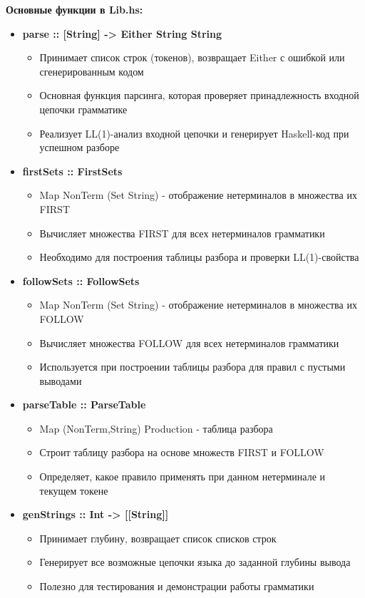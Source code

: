 \documentclass[areasetadvanced]{scrartcl}
\begin{document}
\textbf{Основные функции в Lib.hs:}
\begin{itemize}
  \item \textbf{parse :: [String] -> Either String String}
  \begin{itemize}
    \item Принимает список строк (токенов), возвращает Either с ошибкой или сгенерированным кодом
    \item Основная функция парсинга, которая проверяет принадлежность входной цепочки грамматике
    \item Реализует LL(1)-анализ входной цепочки и генерирует Haskell-код при успешном разборе
  \end{itemize}

  \item \textbf{firstSets :: FirstSets}
  \begin{itemize}
    \item Map NonTerm (Set String) - отображение нетерминалов в множества их FIRST
    \item Вычисляет множества FIRST для всех нетерминалов грамматики
    \item Необходимо для построения таблицы разбора и проверки LL(1)-свойства
  \end{itemize}

  \item \textbf{followSets :: FollowSets}
  \begin{itemize}
    \item Map NonTerm (Set String) - отображение нетерминалов в множества их FOLLOW
    \item Вычисляет множества FOLLOW для всех нетерминалов грамматики
    \item Используется при построении таблицы разбора для правил с пустыми выводами
  \end{itemize}

  \item \textbf{parseTable :: ParseTable}
  \begin{itemize}
    \item Map (NonTerm,String) Production - таблица разбора
    \item Строит таблицу разбора на основе множеств FIRST и FOLLOW
    \item Определяет, какое правило применять при данном нетерминале и текущем токене
  \end{itemize}

  \item \textbf{genStrings :: Int -> [[String]]}
  \begin{itemize}
    \item Принимает глубину, возвращает список списков строк
    \item Генерирует все возможные цепочки языка до заданной глубины вывода
    \item Полезно для тестирования и демонстрации работы грамматики
  \end{itemize}


\end{itemize}
\end{document}
